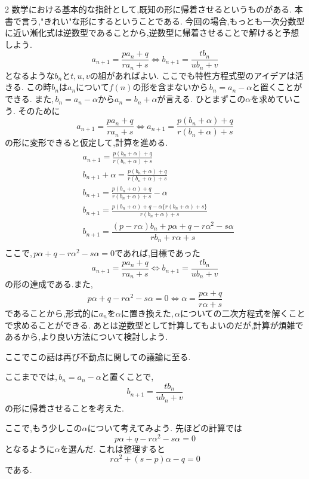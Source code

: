 \documentclass[dvipdfmx,a4paper,11pt,fleqn,openany]{jsbook}
\begin{document}
\begin{multicols*}{2}
      数学における基本的な指針として,既知の形に帰着させるというものがある.
      本書で言う,"きれい"な形にするということである.
      今回の場合,もっとも一次分数型に近い漸化式は逆数型であることから,逆数型に帰着させることで解けると予想しよう.
      \[
        a_{n+1}=\frac{pa_n+q}{ra_n+s} \Leftrightarrow b_{n+1}=\frac{tb_n}{u b_n+v} 
      \]
      となるような$b_n$と$t,u,v$の組があればよい.
      ここでも特性方程式型のアイデアは活きる.
      この時$b_n$は$a_n$について$f(n)$の形を含まないから\,$b_n=a_n-\alpha$と置くことができる. 
      また,\,$b_n=a_n-\alpha$から$a_n=b_n+\alpha$が言える.
      ひとまずこの$\alpha$を求めていこう.
      そのために
      \[
        a_{n+1}=\frac{pa_n+q}{ra_n+s} \Leftrightarrow a_{n+1}=\frac{p(b_n+\alpha)+q}{r(b_n+\alpha)+s}
      \]
      の形に変形できると仮定して,計算を進める.
      \begin{align*}
        &a_{n+1}=\frac{p(b_n+\alpha)+q}{r(b_n+\alpha)+s}\\
        &b_{n+1}+\alpha=\frac{p(b_n+\alpha)+q}{r(b_n+\alpha)+s}\\
        &b_{n+1}=\frac{p(b_n+\alpha)+q}{r(b_n+\alpha)+s}-\alpha\\
        &b_{n+1}=\frac{p(b_n+\alpha)+q-\alpha\{r(b_n+\alpha)+s\}}{r(b_n+\alpha)+s}\\
        &b_{n+1}=\dfrac{(p-r\alpha)b_{n}+p\alpha+q-r\alpha^{2}-s\alpha}{rb_{n}+r\alpha+s}\\
      \end{align*}
      ここで,\,$p\alpha+q-r\alpha^{2}-s\alpha=0$であれば,目標であった
      \[
        a_{n+1}=\frac{pa_n+q}{ra_n+s} \Leftrightarrow b_{n+1}=\frac{tb_n}{u b_n+v} 
      \]
      の形の達成である.また,
      \[
        p\alpha+q-r\alpha^{2}-s\alpha=0 \Leftrightarrow \alpha=\frac{p\alpha+q}{r\alpha+s}
      \]
      であることから,形式的に$a_n$を$\alpha$に置き換えた,\,$\alpha$についての二次方程式を解くことで求めることができる.
      あとは逆数型として計算してもよいのだが,計算が煩雑であるから,より良い方法について検討しよう.

      ここでこの話は再び不動点に関しての議論に至る.
  
      ここまででは,\,$b_n=a_n-\alpha$と置くことで,
      \[
        b_{n+1}=\frac{tb_n}{ub_n+v}
      \]
      の形に帰着させることを考えた.
      
      ここで,もう少しこの$\alpha$について考えてみよう.
      先ほどの計算では
      \[
        p\alpha+q-r\alpha^2-s\alpha=0
      \]
      となるように$\alpha$を選んだ.
      これは整理すると
      \[
        r\alpha^2+(s-p)\alpha-q=0
      \]
      である.
      

\end{multicols*}
\end{document}
